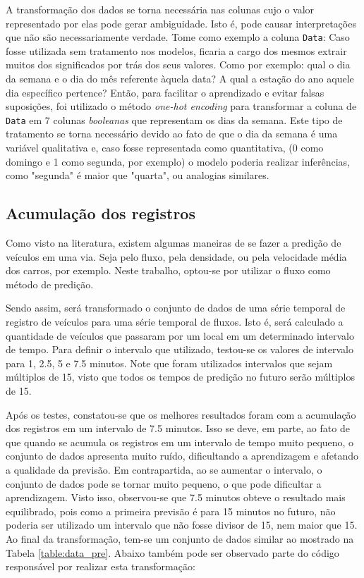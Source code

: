 A transformação dos dados se torna necessária nas colunas cujo o valor representado por elas pode gerar ambiguidade. Isto é, pode causar interpretações que não são necessariamente verdade. Tome como exemplo a coluna \texttt{Data}: Caso fosse utilizada sem tratamento nos modelos, ficaria a cargo dos mesmos extrair muitos dos significados por trás dos seus valores. Como por exemplo: qual o dia da semana e o dia do mês referente àquela data? A qual a estação do ano aquele dia específico pertence? Então, para facilitar o aprendizado e evitar falsas suposições, foi utilizado o método \textit{one-hot encoding} para transformar a coluna de \texttt{Data} em 7 colunas \textit{booleanas} que representam os dias da semana. Este tipo de tratamento se torna necessário devido ao fato de que o dia da semana é uma variável qualitativa e, caso fosse representada como quantitativa, (0 como domingo e 1 como segunda, por exemplo) o modelo poderia realizar inferências, como "segunda" é maior que "quarta", ou analogias similares.

\subsection{Acumulação dos registros}

Como visto na literatura, existem algumas maneiras de se fazer a predição de veículos em uma via. Seja pelo fluxo, pela densidade, ou pela velocidade média dos carros, por exemplo. Neste trabalho, optou-se por utilizar o fluxo como método de predição.

Sendo assim, será transformado o conjunto de dados de uma série temporal de registro de veículos para uma série temporal de fluxos. Isto é, será calculado a quantidade de veículos que passaram por um local em um determinado intervalo de tempo. Para definir o intervalo que utilizado, testou-se os valores de intervalo para 1, 2.5, 5 e 7.5 minutos. Note que foram utilizados intervalos que sejam múltiplos de 15, visto que todos os tempos de predição no futuro serão múltiplos de 15.

Após os testes, constatou-se que os melhores resultados foram com a acumulação dos registros em um intervalo de 7.5 minutos. Isso se deve, em parte, ao fato de que quando se acumula os registros em um intervalo de tempo muito pequeno, o conjunto de dados apresenta muito ruído, dificultando a aprendizagem e afetando a qualidade da previsão. Em contrapartida, ao se aumentar o intervalo, o conjunto de dados pode se tornar muito pequeno, o que pode dificultar a aprendizagem. Visto isso, observou-se que 7.5 minutos obteve o resultado mais equilibrado, pois como a primeira previsão é para 15 minutos no futuro, não poderia ser utilizado um intervalo que não fosse divisor de 15, nem maior que 15. Ao final da transformação, tem-se um conjunto de dados similar ao mostrado na Tabela \ref{table:data_pre}. Abaixo também pode ser observado parte do código responsável por realizar esta transformação:

